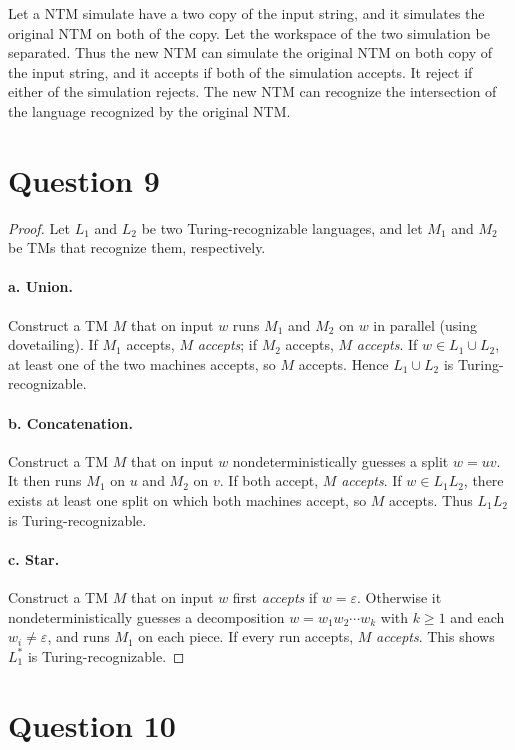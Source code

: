 \documentclass[a4paper, UTF-8]{article}
\theoremstyle{plain}
\begin{document}
Let a NTM simulate have a two copy of the input string, and it simulates the original NTM on both of the copy. Let the workspace of the two simulation be separated. Thus the new NTM can simulate the original NTM on both copy of the input string, and it accepts if both of the simulation accepts. It reject if either of the simulation rejects. The new NTM can recognize the intersection of the language recognized by the original NTM.

\section{Question 9}

\begin{proof}
Let $L_1$ and $L_2$ be two Turing-recognizable languages, and let $M_1$ and $M_2$ be TMs that recognize them, respectively.

\paragraph{a. Union.}
Construct a TM $M$ that on input $w$ runs $M_1$ and $M_2$ on $w$ in parallel (using dovetailing). If $M_1$ accepts, $M$ \emph{accepts}; if $M_2$ accepts, $M$ \emph{accepts}. If $w \in L_1 \cup L_2$, at least one of the two machines accepts, so $M$ accepts. Hence $L_1 \cup L_2$ is Turing-recognizable.

\paragraph{b. Concatenation.}
Construct a TM $M$ that on input $w$ nondeterministically guesses a split $w = uv$. It then runs $M_1$ on $u$ and $M_2$ on $v$. If both accept, $M$ \emph{accepts}. If $w \in L_1 L_2$, there exists at least one split on which both machines accept, so $M$ accepts. Thus $L_1 L_2$ is Turing-recognizable.

\paragraph{c. Star.}
Construct a TM $M$ that on input $w$ first \emph{accepts} if $w = \varepsilon$. Otherwise it nondeterministically guesses a decomposition $w = w_1 w_2 \cdots w_k$ with $k \ge 1$ and each $w_i \neq \varepsilon$, and runs $M_1$ on each piece. If every run accepts, $M$ \emph{accepts}. This shows $L_1^*$ is Turing-recognizable.
\end{proof}

\section{Question 10} 
\end{document}
